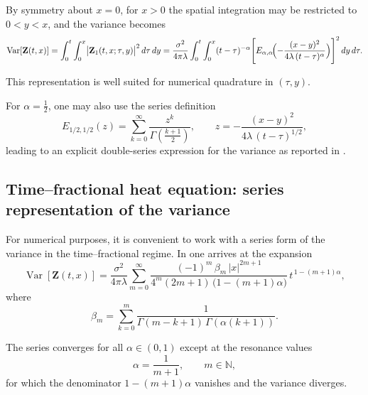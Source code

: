 \documentclass[12pt, reqno]{amsart}
\newcommand{\N}{\ensuremath{\mathbb{N}}}
\newcommand{\Var}{\ensuremath{\operatorname{Var}}}
\newcommand{\bz}{\ensuremath{\mathbf{Z}}}
\begin{document}
By symmetry about $x=0$, for $x>0$ the spatial integration may be restricted to $0<y<x$,
and the variance becomes
\begin{equation*}\label{eq:var_frac_integral}
\Var[\bz(t,x)]
=
\int_0^t\int_{0}^{x}\bigl|\bz_1(t,x;\tau,y)\bigr|^2\,d\tau\,dy
=
\frac{\sigma^2}{4\pi\lambda}\int_0^t\int_0^{x}
(t-\tau)^{-\alpha}
\Biggl[
E_{\alpha,\alpha}\!\Bigl(-\frac{(x-y)^2}{4\lambda\,(t-\tau)^\alpha}\Bigr)
\Biggr]^2\,dy\,d\tau.
\end{equation*}


This representation is well suited for numerical quadrature in $(\tau,y)$.

For $\alpha=\tfrac12$, one may also use the series definition
\begin{equation*}\label{eq:Ehalfhalf_series}
E_{1/2,1/2}(z)=\sum_{k=0}^{\infty}\frac{z^k}{\Gamma\!\left(\frac{k+1}{2}\right)},
\qquad
z=-\frac{(x-y)^2}{4\lambda\,(t-\tau)^{1/2}},
\end{equation*}
leading to an explicit double-series expression for the variance as reported in \cite[\S4.2]{Beltagy1}.


\subsection{Time--fractional heat equation: series representation of the variance}
\label{subsec:series_variance}

For numerical purposes, it is convenient to work with a series form of the variance in the
time--fractional regime. In \cite[\S4.3]{Beltagy1} one arrives at the expansion
\begin{equation*}\label{eq:var_series}
\Var[\bz(t,x)]
=
\frac{\sigma^2}{4\pi\lambda}
\sum_{m=0}^{\infty}
\frac{(-1)^m\,\beta_m\,|x|^{2m+1}}{4^m(2m+1)\,\bigl(1-(m+1)\alpha\bigr)}\,
t^{\,1-(m+1)\alpha},
\end{equation*}
where
\begin{equation*}\label{eq:beta_m}
\beta_m=\sum_{k=0}^{m}\frac{1}{\Gamma(m-k+1)\,\Gamma(\alpha(k+1))}.
\end{equation*}

The series converges for all $\alpha\in(0,1)$ except at the resonance values
\begin{equation*}\label{eq:resonance}
\alpha=\frac{1}{m+1},
\qquad m\in\N,
\end{equation*}
for which the denominator $1-(m+1)\alpha$ vanishes and the variance diverges.
\end{document}
